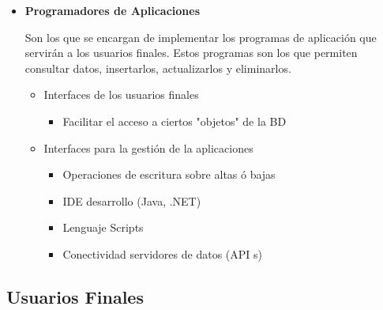\documentclass[12pt, fleqn]{report}                             %
\begin{document}
\begin{itemize}
                \item
                    \textbf{Programadores de Aplicaciones}

                    Son los que se encargan de implementar los programas de aplicación que
                    servirán a los usuarios finales. Estos programas son los que permiten
                    consultar datos, insertarlos, actualizarlos y eliminarlos.

                    \begin{itemize}
                        \item Interfaces de los usuarios finales
                        \begin{itemize}
                            \item Facilitar el acceso a ciertos "objetos" de la BD
                        \end{itemize}

                        \item Interfaces para la gestión de la aplicaciones 
                        \begin{itemize}
                            \item Operaciones de escritura sobre altas ó bajas 
                            \item IDE desarrollo (Java, .NET)
                            \item Lenguaje Scripts
                            \item Conectividad servidores de datos (API s) 
                        \end{itemize}
        
                    \end{itemize}


            \end{itemize}


            \clearpage
            \subsection{Usuarios Finales}
\end{document}
